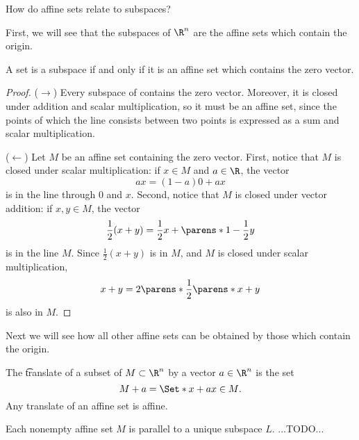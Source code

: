 

How do affine sets relate to subspaces?


First, we will see that the subspaces of $\R^n$ are the affine sets which contain the origin.

\begin{prop}

A set is a subspace if and only if it is an affine set which contains the zero vector.

\begin{proof}

($\rightarrow$) Every subspace of contains the zero vector. Moreover, it is closed under addition and scalar multiplication, so it must be an affine set, since the points of which the line consists between two points is expressed as a sum and scalar multiplication.

($\leftarrow$) Let $M$ be an affine set containing the zero vector. First, notice that $M$ is closed under scalar multiplication: if $x \in M$ and $a \in \R$, the vector
$$
  ax = (1 - a)0 + ax
$$
is in the line through $0$ and $x$.
Second, notice that $M$ is closed under vector addition: if $x, y \in M$, the vector
$$
  \frac{1}{2}(x + y) = \frac{1}{2}x + \parens*{1 - \frac{1}{2}}y
$$
is in the line $M$.
  Since $\frac{1}{2}(x + y)$ is in $M$, and $M$ is closed under scalar multiplication,
$$
  x + y = 2\parens*{\frac{1}{2}\parens*{x + y}}
$$
is also in $M$.

\end{proof}

\end{prop}

Next we will see how all other affine sets can be obtained by those which contain the origin.


The \t{translate} of a subset of $M \subset \R^n$ by a vector $a \in \R^n$ is the set
$$
  M + a = \Set*{x + a}{x \in M}.
$$
Any translate of an affine set is affine.

\begin{prop}

Each nonempty affine set $M$ is parallel to a unique subspace $L$. ...TODO...

\end{prop}
